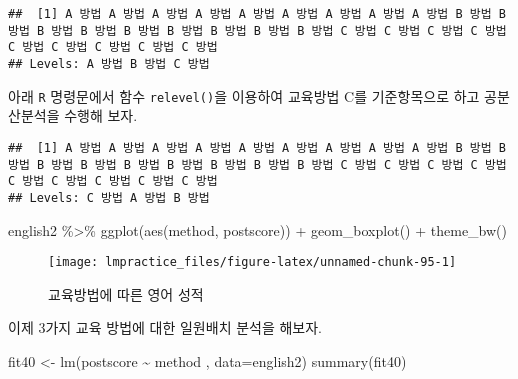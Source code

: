 \documentclass[
]{book}
\newenvironment{Shaded}{\begin{snugshade}}{\end{snugshade}}
\newcommand{\AttributeTok}[1]{\textcolor[rgb]{0.77,0.63,0.00}{#1}}
\newcommand{\FunctionTok}[1]{\textcolor[rgb]{0.00,0.00,0.00}{#1}}
\newcommand{\NormalTok}[1]{#1}
\newcommand{\OtherTok}[1]{\textcolor[rgb]{0.56,0.35,0.01}{#1}}
\newcommand{\SpecialCharTok}[1]{\textcolor[rgb]{0.00,0.00,0.00}{#1}}
\newcommand{\StringTok}[1]{\textcolor[rgb]{0.31,0.60,0.02}{#1}}
\begin{document}
\begin{verbatim}
##  [1] A 방법 A 방법 A 방법 A 방법 A 방법 A 방법 A 방법 A 방법 A 방법 B 방법 B 방법 B 방법 B 방법 B 방법 B 방법 B 방법 B 방법 B 방법 C 방법 C 방법 C 방법 C 방법 C 방법 C 방법 C 방법 C 방법 C 방법
## Levels: A 방법 B 방법 C 방법
\end{verbatim}

아래 \texttt{R} 명령문에서 함수 \texttt{relevel()}을 이용하여 교육방법 C를 기준항목으로 하고 공분산분석을 수행해 보자.

\begin{Shaded}
\end{Shaded}

\begin{verbatim}
##  [1] A 방법 A 방법 A 방법 A 방법 A 방법 A 방법 A 방법 A 방법 A 방법 B 방법 B 방법 B 방법 B 방법 B 방법 B 방법 B 방법 B 방법 B 방법 C 방법 C 방법 C 방법 C 방법 C 방법 C 방법 C 방법 C 방법 C 방법
## Levels: C 방법 A 방법 B 방법
\end{verbatim}

\begin{Shaded}
\begin{Highlighting}[]
\NormalTok{english2 }\SpecialCharTok{\%\textgreater{}\%} \FunctionTok{ggplot}\NormalTok{(}\FunctionTok{aes}\NormalTok{(method, postscore)) }\SpecialCharTok{+} \FunctionTok{geom\_boxplot}\NormalTok{()  }\SpecialCharTok{+} \FunctionTok{theme\_bw}\NormalTok{()}
\end{Highlighting}
\end{Shaded}

\begin{figure}

{\centering \texttt{[image: lmpractice\_files/figure-latex/unnamed-chunk-95-1]} 

}

\caption{교육방법에 따른 영어 성적}\label{fig:unnamed-chunk-95}
\end{figure}

이제 3가지 교육 방법에 대한 일원배치 분석을 해보자.

\begin{Shaded}
\begin{Highlighting}[]
\NormalTok{fit40 }\OtherTok{\textless{}{-}} \FunctionTok{lm}\NormalTok{(postscore }\SpecialCharTok{\textasciitilde{}}\NormalTok{ method , }\AttributeTok{data=}\NormalTok{english2)}
\FunctionTok{summary}\NormalTok{(fit40)}
\end{Highlighting}
\end{Shaded}
\end{document}
